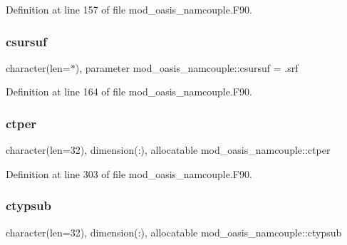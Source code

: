 Definition at line 157 of file mod\+\_\+oasis\+\_\+namcouple.\+F90.

\mbox{\label{namespacemod__oasis__namcouple_ad0ee67817c139b0c78721a9adf102cb3}} 
\subsubsection{\texorpdfstring{csursuf}{csursuf}}
{\footnotesize\ttfamily character(len=$\ast$), parameter mod\+\_\+oasis\+\_\+namcouple\+::csursuf = \textquotesingle{}.srf\textquotesingle{}\hspace{0.3cm}{\ttfamily [private]}}



Definition at line 164 of file mod\+\_\+oasis\+\_\+namcouple.\+F90.

\mbox{\label{namespacemod__oasis__namcouple_a48b8ec939d711809229e738e68efe6b4}} 
\subsubsection{\texorpdfstring{ctper}{ctper}}
{\footnotesize\ttfamily character(len=32), dimension(\+:), allocatable mod\+\_\+oasis\+\_\+namcouple\+::ctper\hspace{0.3cm}{\ttfamily [private]}}



Definition at line 303 of file mod\+\_\+oasis\+\_\+namcouple.\+F90.

\mbox{\label{namespacemod__oasis__namcouple_aa82cea995f7a2c9fd7bfd3703a4593d1}} 
\subsubsection{\texorpdfstring{ctypsub}{ctypsub}}
{\footnotesize\ttfamily character(len=32), dimension(\+:), allocatable mod\+\_\+oasis\+\_\+namcouple\+::ctypsub\hspace{0.3cm}{\ttfamily [private]}}



